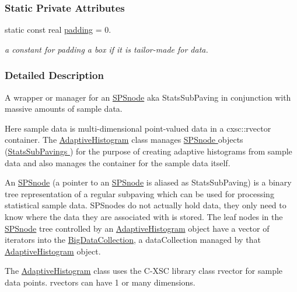 \subsubsection*{\-Static \-Private \-Attributes}
\begin{DoxyCompactItemize}
\item 
static const real \hyperlink{classsubpavings_1_1AdaptiveHistogram_a73e006381e43e152b7dbb63211a3ac09}{padding} = 0.
\begin{DoxyCompactList}\small\item\em a constant for padding a box if it is tailor-\/made for data. \end{DoxyCompactList}\end{DoxyCompactItemize}


\subsubsection{\-Detailed \-Description}
\-A wrapper or manager for an \hyperlink{classsubpavings_1_1SPSnode}{\-S\-P\-Snode} aka \-Stats\-Sub\-Paving in conjunction with massive amounts of sample data. 

\-Here sample data is multi-\/dimensional point-\/valued data in a cxsc\-::rvector container. \-The \hyperlink{classsubpavings_1_1AdaptiveHistogram}{\-Adaptive\-Histogram} class manages \hyperlink{classsubpavings_1_1SPSnode}{\-S\-P\-Snode } objects (\hyperlink{namespacesubpavings_ace6b16f0adf0db13eeb38e124d5328c6}{\-Stats\-Sub\-Pavings }) for the purpose of creating adaptive histograms from sample data and also manages the container for the sample data itself.

\-An \hyperlink{classsubpavings_1_1SPSnode}{\-S\-P\-Snode} (a pointer to an \hyperlink{classsubpavings_1_1SPSnode}{\-S\-P\-Snode} is aliased as \-Stats\-Sub\-Paving) is a binary tree representation of a regular subpaving which can be used for processing statistical sample data. \-S\-P\-Snodes do not actually hold data, they only need to know where the data they are associated with is stored. \-The leaf nodes in the \hyperlink{classsubpavings_1_1SPSnode}{\-S\-P\-Snode} tree controlled by an \hyperlink{classsubpavings_1_1AdaptiveHistogram}{\-Adaptive\-Histogram} object have a vector of iterators into the \hyperlink{namespacesubpavings_aa79f33663da92502ce1a37f3fd1f3d85}{\-Big\-Data\-Collection}, a data\-Collection managed by that \hyperlink{classsubpavings_1_1AdaptiveHistogram}{\-Adaptive\-Histogram} object.

\-The \hyperlink{classsubpavings_1_1AdaptiveHistogram}{\-Adaptive\-Histogram} class uses the \-C-\/\-X\-S\-C library class rvector for sample data points. rvectors can have 1 or many dimensions. 

